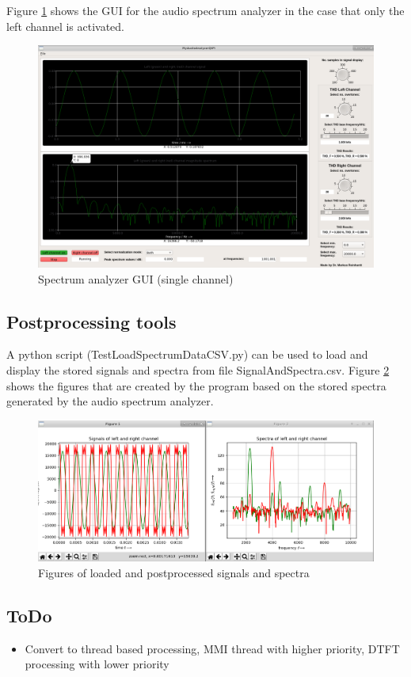 \documentclass[11pt, oneside]{scrartcl}   	%
\begin{document}
Figure \ref{fig:SpectrumAnalyzerGUI2} shows the GUI for the audio spectrum analyzer in the case that only the left channel is activated.
\begin{figure}[tbph]
	\centering
	\includegraphics[width=\linewidth]{MyAudioSpectrumAnalyzerGUILeftChannel.png}
	\caption[Spectrum analyzer GUI (single channel)]{Spectrum analyzer GUI (single channel)}
	\label{fig:SpectrumAnalyzerGUI2}
\end{figure}

\subsection{Postprocessing tools}
A python script (TestLoadSpectrumDataCSV.py) can be used to load and display the stored signals and spectra from file SignalAndSpectra.csv.
Figure \ref{fig:TestLoadSpectraCSVDisplays} shows the figures that are created by the program based on the stored spectra generated by the audio spectrum analyzer.
\begin{figure}[tbph]
	\centering
	\includegraphics[width=\linewidth]{TestLoadSpectraCSVDisplays.png}
	\caption[Figures of loaded and postprocessed signals and spectra]{Figures of loaded and postprocessed signals and spectra}
	\label{fig:TestLoadSpectraCSVDisplays}
\end{figure}

\subsection{ToDo}
\begin{itemize}
	\item Convert to thread based processing, MMI thread with higher priority, DTFT processing with lower priority
\end{itemize}
\end{document}
